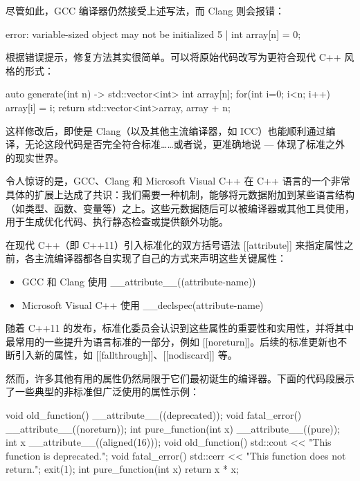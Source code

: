 尽管如此，GCC 编译器仍然接受上述写法，而 Clang 则会报错：

\begin{shell}
error: variable-sized object may not be initialized
   5 | int array[n] = {0};
\end{shell}

根据错误提示，修复方法其实很简单。可以将原始代码改写为更符合现代 C++ 风格的形式：

\begin{cpp}
auto generate(int n) -> std::vector<int>{
  int array[n];
  for(int i=0; i<n; i++) array[i] = i;
  return std::vector<int>{array, array + n};
}
\end{cpp}

这样修改后，即使是 Clang（以及其他主流编译器，如 ICC）也能顺利通过编译，无论这段代码是否完全符合标准……或者说，更准确地说 --- 体现了标准之外的现实世界。


令人惊讶的是，GCC、Clang 和 Microsoft Visual C++ 在 C++ 语言的一个非常具体的扩展上达成了共识：我们需要一种机制，能够将元数据附加到某些语言结构（如类型、函数、变量等）之上。这些元数据随后可以被编译器或其他工具使用，用于生成优化代码、执行静态检查或提供额外功能。

在现代 C++（即 C++11）引入标准化的双方括号语法 [[attribute]] 来指定属性之前，各主流编译器都各自实现了自己的方式来声明这些关键属性：

\begin{itemize}
\item 
GCC 和 Clang 使用 \_\_attribute\_\_((attribute-name))

\item 
Microsoft Visual C++ 使用 \_\_declspec(attribute-name)
\end{itemize}

随着 C++11 的发布，标准化委员会认识到这些属性的重要性和实用性，并将其中最常用的一些提升为语言标准的一部分，例如 [[noreturn]]。后续的标准更新也不断引入新的属性，如 [[fallthrough]]、[[nodiscard]] 等。

然而，许多其他有用的属性仍然局限于它们最初诞生的编译器。下面的代码段展示了一些典型的非标准但广泛使用的属性示例：

\begin{cpp}
void old_function() __attribute__((deprecated));
void fatal_error() __attribute__((noreturn));
int pure_function(int x) __attribute__((pure));
int x __attribute__((aligned(16)));
void old_function() {
  std::cout << "This function is deprecated.";
}
void fatal_error() {
  std::cerr << "This function does not return.";
  exit(1);
}
int pure_function(int x) {
  return x * x;
}
\end{cpp}

